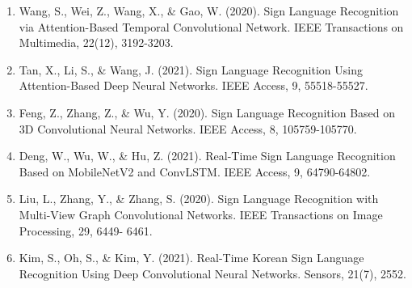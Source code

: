 \begin{enumerate}
    \item  Wang, S., Wei, Z., Wang, X., & Gao, W. (2020). Sign Language Recognition via
Attention-Based Temporal Convolutional Network. IEEE Transactions on Multimedia,
22(12), 3192-3203.

    \item  Tan, X., Li, S., & Wang, J. (2021). Sign Language Recognition Using Attention-Based
Deep Neural Networks. IEEE Access, 9, 55518-55527.


    \item  Feng, Z., Zhang, Z., & Wu, Y. (2020). Sign Language Recognition Based on 3D
Convolutional Neural Networks. IEEE Access, 8, 105759-105770.

    \item  Deng, W., Wu, W., & Hu, Z. (2021). Real-Time Sign Language Recognition Based on
MobileNetV2 and ConvLSTM. IEEE Access, 9, 64790-64802.


    \item  Liu, L., Zhang, Y., & Zhang, S. (2020). Sign Language Recognition with Multi-View
Graph Convolutional Networks. IEEE Transactions on Image Processing, 29, 6449-
6461.

    \item  Kim, S., Oh, S., & Kim, Y. (2021). Real-Time Korean Sign Language Recognition
Using Deep Convolutional Neural Networks. Sensors, 21(7), 2552.
\end{enumerate}

